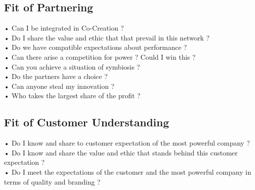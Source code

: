 \subsection{Fit of Partnering}

• Can I be integrated in Co-Creation ? \\
• Do I share the value and ethic that that prevail in this network ? \\
• Do we have compatible expectations about performance ? \\
• Can there arise a competition for power ? Could I win this ? \\
• Can you achieve a situation of symbiosis ? \\
• Do the partners have a choice ? \\
• Can anyone steal my innovation ? \\
• Who takes the largest share of the profit ? \\

\subsection{Fit of Customer Understanding}

• Do I know and share to customer expectation of the most powerful company ? \\
• Do I know and share the value and ethic that stands behind this customer expectation ? \\
• Do I meet the expectations of the customer and the most powerful company in terms of quality and branding ? \\
